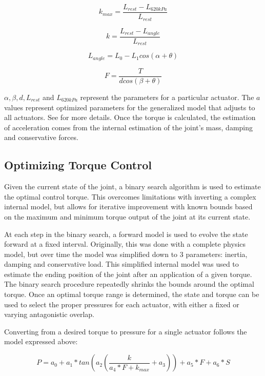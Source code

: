 \documentclass[letterpaper, 10 pt, conference]{IEEEconf} %
\newcommand{\bbss}[1]{\subsection{#1}}
\begin{document}
\begin{equation}
k_{max} = \dfrac{L_{rest} - L_{620 kPa}}{L_{rest}}
\end{equation}

\begin{equation}
k = \dfrac{L_{rest} - L_{angle}}{L_{rest}}
\end{equation}

\begin{equation}
L_{angle} = L_{0} - L_{1} cos(\alpha + \theta)
\end{equation}

\begin{equation}
F = \dfrac{T}{d cos(\beta + \theta)}
\end{equation}

$\alpha, \beta, d, L_{rest}$ and $L_{620 kPa}$ represent the parameters for a 
particular actuator. The $a$ values represent optimized parameters
for the generalized model that adjusts to all actuators. See \cite{HuntPMuscles}
for more details. Once the torque is calculated, the 
estimation of acceleration comes from the internal estimation of the joint's mass, damping and conservative forces.

\bbss{Optimizing Torque Control}

Given the current state of the joint, a binary search algorithm is used to
estimate the optimal control torque. This overcomes limitations with inverting
a complex internal model, but allows for iterative improvement with known bounds
based on the maximum and minimum torque output of the joint at its current 
state.

At each step in the binary search, a forward model is used to evolve the state 
forward at a fixed interval. Originally, this was done with a complete physics
model, but over time the model was simplified down to 3 parameters: inertia, 
damping and conservative load. This simplified internal model was used to 
estimate the ending position of the joint after an application of a given 
torque. The binary search procedure repeatedly shrinks the bounds around the 
optimal torque. Once an optimal torque range is determined, the state and torque
can be used to select the proper pressures for each actuator, with either a 
fixed or varying antagonistic overlap.

Converting from a desired torque to pressure for a single actuator follows
the model expressed above:

\begin{equation}
P = a_{0} + a_{1} * tan(a_{2} (\dfrac{k}{a_{4} * F + k_{max}} + a_{3})) + a_{5} * F + a_{6} * S
\end{equation}
\end{document}

